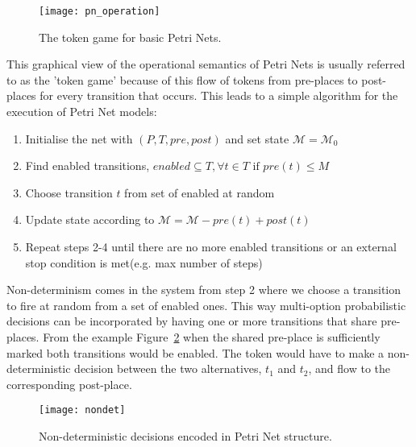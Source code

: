 \begin{figure}
\centering
\texttt{[image: pn\_operation]}
\caption{The token game for basic Petri Nets.}
\label{fig:pn_operation}
\end{figure}

This graphical view of the operational semantics of Petri Nets is
usually referred to as the 'token game' because of this flow of tokens
from pre-places to post-places for every transition that occurs. This
leads to a simple algorithm for the execution of Petri Net models:

\begin{enumerate}[noitemsep]
\item Initialise the net  with $(P, T, pre, post)$ and set state $\mathcal{M} = \mathcal{M}_0$
\item Find enabled transitions, $enabled \subseteq T, \forall t \in T \mbox{ if } pre(t) \leq M$
\item Choose transition $t$ from set of enabled at random
\item Update state according to $\mathcal{M} = \mathcal{M} -pre(t) + post(t)$
\item Repeat steps 2-4 until there are no more enabled transitions or an external stop condition is met(e.g. max number of steps)
\end{enumerate}
Non-determinism comes in the system from step 2 where we choose a
transition to fire at random from a set of enabled ones. This way multi-option
probabilistic decisions can be incorporated by having one or more
transitions that share pre-places. From the
example Figure~\ref{fig:nondet} when the shared pre-place is
sufficiently marked both transitions would be enabled. The token would
have to make a non-deterministic decision between the two
alternatives, $t_1$ and $t_2$, and flow to the corresponding
post-place.

\begin{figure}
\centering
\texttt{[image: nondet]}
\caption{Non-deterministic decisions encoded in Petri Net structure.}
\label{fig:nondet}
\end{figure}

